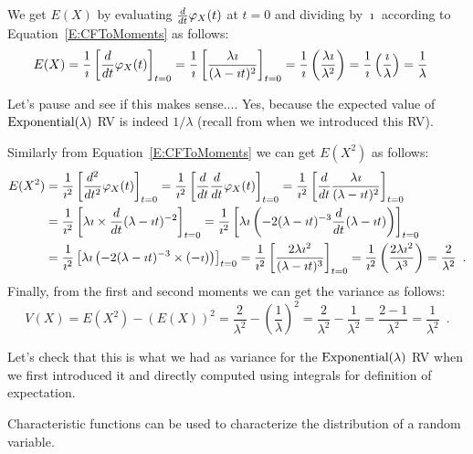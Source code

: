 \begin{example}
We get $E(X)$ by evaluating $\frac{d}{dt}\varphi_X(t)$ at $t=0$ and dividing by $\imath$ according to Equation~\eqref{E:CFToMoments} as follows:
\begin{align*}
E(X)
&= \frac{1}{\imath} \left[ \frac{d}{dt}\varphi_X(t) \right]_{t=0} 
= \frac{1}{\imath} \left[ \frac{\lambda \imath}{(\lambda-\imath t)^{2}} \right]_{t=0} 
= \frac{1}{\imath} \left( \frac{\lambda \imath}{\lambda^{2}} \right) 
= \frac{1}{\imath} \left( \frac{\imath}{\lambda} \right) 
=  \frac{1}{\lambda} 
\end{align*}

Let's pause and see if this makes sense.... Yes, because the expected value of $\mbox{{\rm Exponential}}(\lambda)$ RV is indeed $1/\lambda$ (recall from when we introduced this RV).

Similarly from Equation~\eqref{E:CFToMoments} we can get $E(X^2)$ as follows:
\begin{align*}
E(X^2)
&= \frac{1}{\imath^2} \left[ \frac{d^2}{dt^2}\varphi_X(t) \right]_{t=0} 
= \frac{1}{\imath^2} \left[ \frac{d}{dt} \frac{d}{dt} \varphi_X(t) \right]_{t=0} 
= \frac{1}{\imath^2} \left[ \frac{d}{dt} \frac{\lambda \imath}{(\lambda-\imath t)^{2}} \right]_{t=0} \\
&= \frac{1}{\imath^2} \left[ \lambda \imath \times \frac{d}{dt} {(\lambda-\imath t)^{-2}} \right]_{t=0} 
= \frac{1}{\imath^2} \left[ \lambda \imath \left( -2(\lambda-\imath t)^{-3} \frac{d}{dt} {(\lambda-\imath t)} \right) \right]_{t=0}\\ 
&= \frac{1}{\imath^2} \left[ \lambda \imath \left( -2(\lambda-\imath t)^{-3} \times (-\imath ) \right) \right]_{t=0}
= \frac{1}{\imath^2} \left[ \frac{2 \lambda \imath^2}{(\lambda-\imath t)^{3}} \right]_{t=0}
= \frac{1}{\imath^2} \left( \frac{2 \lambda \imath^2}{\lambda^{3}} \right) 
=  \frac{2}{\lambda^{2}}\enspace.
\end{align*}
Finally, from the first and second moments we can get the variance as follows:
\[
V(X) = E(X^2) - (E(X))^2 = \frac{2}{\lambda^2} - \left(\frac{1}{\lambda}\right)^2  = \frac{2}{\lambda^2} - \frac{1}{\lambda^2} = \frac{2-1}{\lambda^2} = \frac{1}{\lambda^2}   \enspace .
\]

Let's check that this is what we had as variance for the $\mbox{{\rm Exponential}}(\lambda)$ RV when we first introduced it and directly computed using integrals for definition of expectation.
\end{example}

Characteristic functions can be used to characterize the distribution of a random variable.


